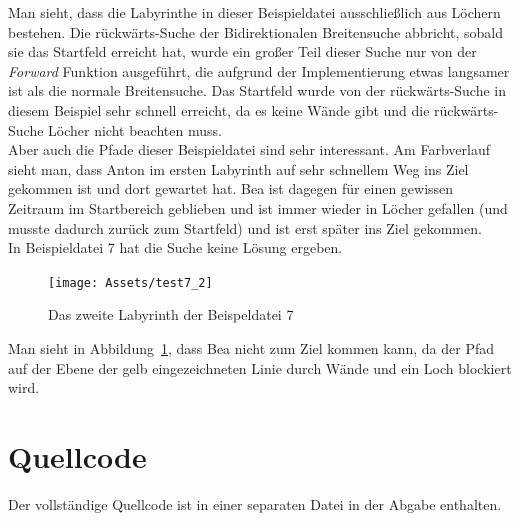\documentclass[a4paper,10pt,ngerman]{scrartcl}
\begin{document}
    Man sieht, dass die Labyrinthe in dieser Beispieldatei ausschließlich aus Löchern bestehen.
    Die rückwärts-Suche der Bidirektionalen Breitensuche abbricht, sobald sie das Startfeld erreicht hat, wurde ein großer Teil dieser Suche nur von der \textit{Forward} Funktion ausgeführt, die aufgrund der Implementierung etwas langsamer ist als die normale Breitensuche.
    Das Startfeld wurde von der rückwärts-Suche in diesem Beispiel sehr schnell erreicht, da es keine Wände gibt und die rückwärts-Suche Löcher nicht beachten muss. \\
    Aber auch die Pfade dieser Beispieldatei sind sehr interessant.
    Am Farbverlauf sieht man, dass Anton im ersten Labyrinth auf sehr schnellem Weg ins Ziel gekommen ist und dort gewartet hat.
    Bea ist dagegen für einen gewissen Zeitraum im Startbereich geblieben und ist immer wieder in Löcher gefallen (und musste dadurch zurück zum Startfeld) und ist erst später ins Ziel gekommen. \\
    In Beispieldatei 7 hat die Suche keine Lösung ergeben.
    \begin{figure}[H]
        \label{fig:7}
        \centering
        \texttt{[image: Assets/test7\_2]}

        \caption{Das zweite Labyrinth der Beispeldatei 7}
    \end{figure}
    Man sieht in Abbildung~\ref{fig:7}, dass Bea nicht zum Ziel kommen kann, da der Pfad auf der Ebene der gelb eingezeichneten Linie durch Wände und ein Loch blockiert wird.


    \section{Quellcode}
    Der vollständige Quellcode ist in einer separaten Datei in der Abgabe enthalten.
\end{document}
